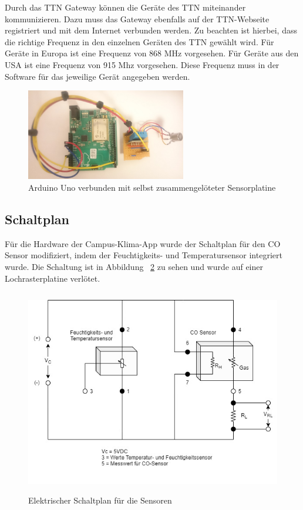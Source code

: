 \documentclass{article}
\begin{document}
Durch das TTN Gateway können die Geräte des TTN miteinander kommunizieren.
Dazu muss das Gateway ebenfalls auf der TTN-Webseite registriert und mit dem Internet verbunden werden.
Zu beachten ist hierbei, dass die richtige Frequenz in den einzelnen Geräten des TTN gewählt wird. 
Für Geräte in Europa ist eine Frequenz von 868 MHz vorgesehen. 
Für Geräte aus den USA ist eine Frequenz von 915 Mhz vorgesehen.
Diese Frequenz muss in der Software für das jeweilige Gerät angegeben werden\cite{TheThingsNetwork-Gateway.2020}.\\


\begin{figure}[h]
 \centering
 \includegraphics[height=4cm]{images/Arduino_Uno.JPG}
 \caption[Foto der Hardware]{Arduino Uno verbunden mit selbst zusammengelöteter Sensorplatine}
 \label{fig:schaltplan_uno}
\end{figure}

\subsection{Schaltplan}
Für die Hardware der Campus-Klima-App wurde der Schaltplan für den CO Sensor modifiziert, indem der Feuchtigkeits- und Temperatursensor integriert wurde.
Die Schaltung ist in Abbildung ~\ref{fig:schaltplan} zu sehen und wurde auf einer Lochrasterplatine verlötet.

\begin{figure}[h]
 \centering
 \includegraphics[height=9cm]{images/Schaltplan_Sensoren}
 \caption{Elektrischer Schaltplan für die Sensoren}
 \label{fig:schaltplan}
\end{figure}
\end{document}
